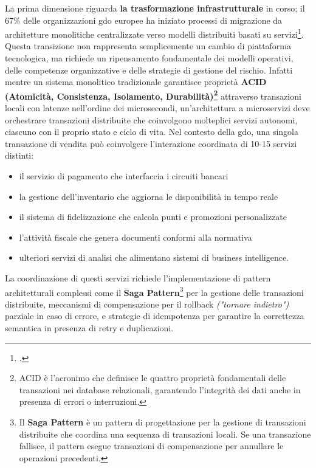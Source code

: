 La prima dimensione riguarda \textbf{la trasformazione infrastrutturale} in corso; il 67\% delle organizzazioni \gls{gdo} europee ha iniziato processi di migrazione da architetture monolitiche centralizzate verso modelli distribuiti basati su servizi\footcite{gartner2024cloud}. Questa transizione non rappresenta semplicemente un cambio di piattaforma tecnologica, ma richiede un ripensamento fondamentale dei modelli operativi, delle competenze organizzative e delle strategie di gestione del rischio. Infatti mentre un sistema monolitico tradizionale garantisce proprietà \textbf{ACID (Atomicità, Consistenza, Isolamento, Durabilità)\footnote{ACID è l'acronimo che definisce le quattro proprietà fondamentali delle transazioni nei database relazionali, garantendo l'integrità dei dati 
anche in presenza di errori o interruzioni.}} attraverso transazioni locali con latenze nell'ordine dei microsecondi, un'architettura a microservizi deve orchestrare transazioni distribuite che coinvolgono molteplici servizi autonomi, ciascuno con il proprio stato e ciclo di vita. 
Nel contesto della \gls{gdo}, una singola transazione di vendita può coinvolgere l'interazione coordinata di 10-15 servizi distinti: 
\begin{itemize}
    \item il servizio di pagamento che interfaccia i circuiti bancari
    \item la gestione dell'inventario che aggiorna le disponibilità in tempo reale
    \item il sistema di fidelizzazione che calcola punti e promozioni personalizzate
    \item l'attività fiscale che genera documenti conformi alla normativa
    \item ulteriori servizi di analisi che alimentano sistemi di business intelligence.
\end{itemize}
La coordinazione di questi servizi richiede l'implementazione di pattern architetturali complessi come il \textbf{Saga Pattern}\footnote{Il \textbf{Saga Pattern} è un pattern di progettazione per la gestione di transazioni distribuite che coordina una sequenza di transazioni locali. Se una transazione fallisce, il pattern esegue transazioni di compensazione per annullare le operazioni precedenti.} per la gestione delle transazioni distribuite, meccanismi di compensazione per il rollback \emph{("tornare indietro")} parziale in caso di errore, e strategie di idempotenza per garantire la correttezza semantica in presenza di retry e duplicazioni.

